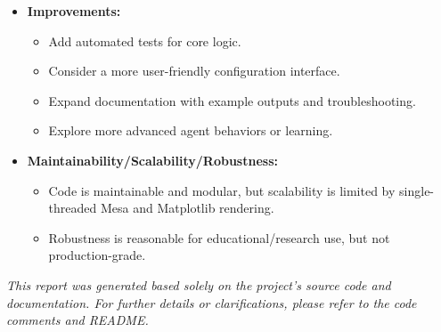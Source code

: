 \documentclass[12pt,a4paper]{article}
\begin{document}
\begin{itemize}
    \item \textbf{Improvements:}
    \begin{itemize}
        \item Add automated tests for core logic.
        \item Consider a more user-friendly configuration interface.
        \item Expand documentation with example outputs and troubleshooting.
        \item Explore more advanced agent behaviors or learning.
    \end{itemize}
    \item \textbf{Maintainability/Scalability/Robustness:}
    \begin{itemize}
        \item Code is maintainable and modular, but scalability is limited by single-threaded Mesa and Matplotlib rendering.
        \item Robustness is reasonable for educational/research use, but not production-grade.
    \end{itemize}
\end{itemize}

\vspace{1em}
\noindent\textit{This report was generated based solely on the project’s source code and documentation. For further details or clarifications, please refer to the code comments and README.}
\end{document}
